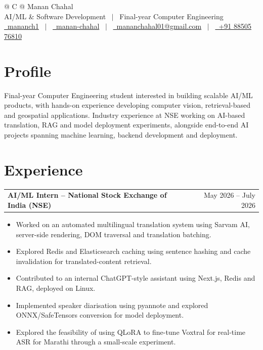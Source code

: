 \documentclass[a4paper,10pt]{article}
\makeatletter
\newenvironment{joblong}[2]
    {
    \begin{tabularx}{\linewidth}{@{}l X r@{}}
    \textbf{#1} & \hfill &  #2 \\[2.5pt]
    \end{tabularx}
    \begin{minipage}[t]{\linewidth}
    \begin{itemize}[nosep,after=\strut, leftmargin=2.3em, itemsep=1.8pt,label=\textbullet]
    }
    {
    \end{itemize}
    \end{minipage}    
    }
\makeatother
\begin{document}
\pagestyle{empty} 


\begin{tabularx}{\linewidth}{@{} C @{}}
\Huge{Manan Chahal} \\[3pt]
\small{AI/ML \& Software Development \ $|$ \ Final-year Computer Engineering} \\[3pt]
\href{https://github.com/mananch1}{\raisebox{-0.05\height}\faGithub\ mananch1} \ $|$ \ 
\href{https://linkedin.com/in/manan-chahal-6a55212a7/}{\raisebox{-0.05\height}\faLinkedin\ manan-chahal} \ $|$ \ 
\href{mailto:mananchahal01@gmail.com}{\raisebox{-0.05\height}\faEnvelope \ mananchahal01@gmail.com} \ $|$ \ 
\href{tel:+918850576810}{\raisebox{-0.05\height}\faMobile \ +91 88505 76810} \\
\end{tabularx}

\section{Profile}
Final-year Computer Engineering student interested in building scalable AI/ML products, with hands-on experience developing computer vision, retrieval-based and geospatial applications. Industry experience at NSE working on AI-based translation, RAG and model deployment experiments, alongside end-to-end AI projects spanning machine learning, backend development and deployment.

\section{Experience}
\begin{joblong}{AI/ML Intern -- National Stock Exchange of India (NSE)}{May 2026 -- July 2026}
\item Worked on an automated multilingual translation system using Sarvam AI, server-side rendering, DOM traversal and translation batching.
\item Explored Redis and Elasticsearch caching using sentence hashing and cache invalidation for translated-content retrieval.
\item Contributed to an internal ChatGPT-style assistant using Next.js, Redis and RAG, deployed on Linux.
\item Implemented speaker diarisation using pyannote and explored ONNX/SafeTensors conversion for model deployment.
\item Explored the feasibility of using QLoRA to fine-tune Voxtral for real-time ASR for Marathi through a small-scale experiment.
\end{joblong}
\end{document}
